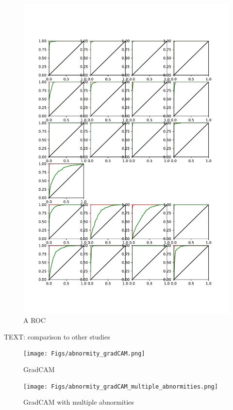 \documentclass{article}
\begin{document}
	\begin{figure}[htbp]
		\centering
		\includegraphics[width=\linewidth]{Figs/abnormity_ROC.pdf}
		\caption{A ROC}
		\vspace{0.3cm}
		\label{fig:A_ROC}
	\end{figure}
	
	TEXT: comparison to other studies
	
	\begin{figure}[htbp]
		\centering
		\texttt{[image: Figs/abnormity\_gradCAM.png]}
		\caption{GradCAM}
		\vspace{0.3cm}
		\label{fig:gradCAM}
	\end{figure}
	\begin{figure}[htbp]
		\centering
		\texttt{[image: Figs/abnormity\_gradCAM\_multiple\_abnormities.png]}
		\caption{GradCAM with multiple abnormities}
		\vspace{0.3cm}
		\label{fig:gradCAM_multi_abnormity}
	\end{figure}
	
\end{document}
